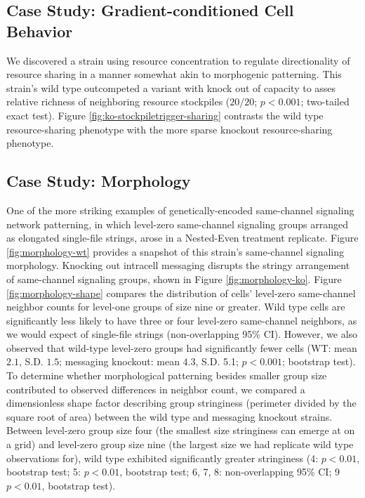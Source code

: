 \subsection{Case Study: Gradient-conditioned Cell Behavior} \label{sec:gradient-conditioned-behavior}



We discovered a strain using resource concentration to regulate directionality of resource sharing in a manner somewhat akin to morphogenic patterning.
This strain's wild type outcompeted a variant with knock out of capacity to asses relative richness of neighboring resource stockpiles ($20/20$; $p < 0.001$; two-tailed exact test).
Figure \ref{fig:ko-stockpiletrigger-sharing} contrasts the wild type resource-sharing phenotype  with the more sparse knockout resource-sharing phenotype.

\subsection{Case Study: Morphology} \label{sec:morphology}



One of the more striking examples of genetically-encoded same-channel signaling network patterning, in which level-zero same-channel signaling groups arranged as elongated single-file strings, arose in a Nested-Even treatment replicate.
Figure \ref{fig:morphology-wt} provides a snapshot of this strain's same-channel signaling morphology.
Knocking out intracell messaging disrupts the stringy arrangement of same-channel signaling groups, shown in Figure \ref{fig:morphology-ko}.
Figure \ref{fig:morphology-shape} compares the distribution of cells' level-zero same-channel neighbor counts for level-one groups of size nine or greater.
Wild type cells are significantly less likely to have three or four level-zero same-channel neighbors, as we would expect of single-file strings (non-overlapping 95\% CI).
However, we also observed that wild-type level-zero groups had significantly fewer cells
(WT: mean $2.1$, S.D. $1.5$; messaging knockout: mean $4.3$, S.D. 5.1; $p < 0.001$; bootstrap test).
To determine whether morphological patterning besides smaller group size contributed to observed differences in neighbor count, we compared a dimensionless shape factor describing group stringiness (perimeter divided by the square root of area) between the wild type and messaging knockout strains.
Between level-zero group size four (the smallest size stringiness can emerge at on a grid) and level-zero group size nine (the largest size we had replicate wild type observations for), wild type exhibited significantly greater stringiness
(4: $p < 0.01$, bootstrap test; 5: $p < 0.01$, bootstrap test; 6, 7, 8: non-overlapping 95\% CI; 9 $p < 0.01$, bootstrap test).

